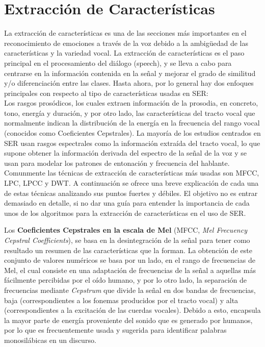 \documentclass[11pt,a4paper,spanish]{book}
\begin{document}
	\section{Extracción de Características}
	La extracción de características es una de las secciones más importantes en el reconocimiento de emociones a través de la voz debido a la ambigüedad de las características y la variedad vocal. La extracción de características es el paso principal en el procesamiento del diálogo (speech), y se lleva a cabo para centrarse en la información contenida en la señal y mejorar el grado de similitud y/o diferenciación entre las clases.\cite{Hellbernd2016} Hasta ahora, por lo general hay dos enfoques principales  con respecto al tipo de características usadas en SER:\\
	Los rasgos prosódicos, los cuales extraen información de la prosodia, en concreto, tono, energía y duración, y por otro lado, las características del tracto vocal que normalmente indican la distribución de la energía en la frecuencia del rango vocal (conocidos como Coeficientes Cepstrales).
	La mayoría de los estudios centrados en SER usan rasgos espectrales como la información extraída del tracto vocal, lo que supone obtener la información derivada del espectro de la señal de la voz y se usan para modelar los patrones de entonación y frecuencia del hablante\cite{Langari2020}.\\
	
	Comunmente las técnicas de extracción de características más usadas son 
	MFCC, LPC, LPCC y DWT. A continuación se ofrece una breve explicación de cada una de estas técnicas analizando sus puntos fuertes y débiles.\cite{Rashid2018} El objetivo no es entrar demasiado en detalle, si no dar una guía para entender la importancia de cada unos de los algoritmos para la extracción de características en el uso de SER.\hfill \break
	
	Los \textbf{Coeficientes Cepstrales en la escala de Mel} (MFCC, \emph{Mel Frecuency Cepstral Coefficients}), se basa en la desintegración de la señal para tener como resultado un resumen de las características que la forman. La obtención de este conjunto de valores numéricos se basa por un lado, en el rango de frecuencias de Mel, el cual consiste en una adaptación de frecuencias de la señal a aquellas más fácilmente percibidas por el oído humano, y por lo otro lado, la separación de frecuencias mediante \emph{Cepstrum} que divide la señal en dos bandas de frecuencias, baja (correspondientes a los fonemas producidos por el tracto vocal) y alta (correspondientes a la excitación de las cuerdas vocales). Debido a esto, encapsula la mayor parte de energía proveniente del sonido que es generado por humanos, por lo que es frecuentemente usada y sugerida para identificar palabras monosilábicas en un discurso.
	
\end{document}
